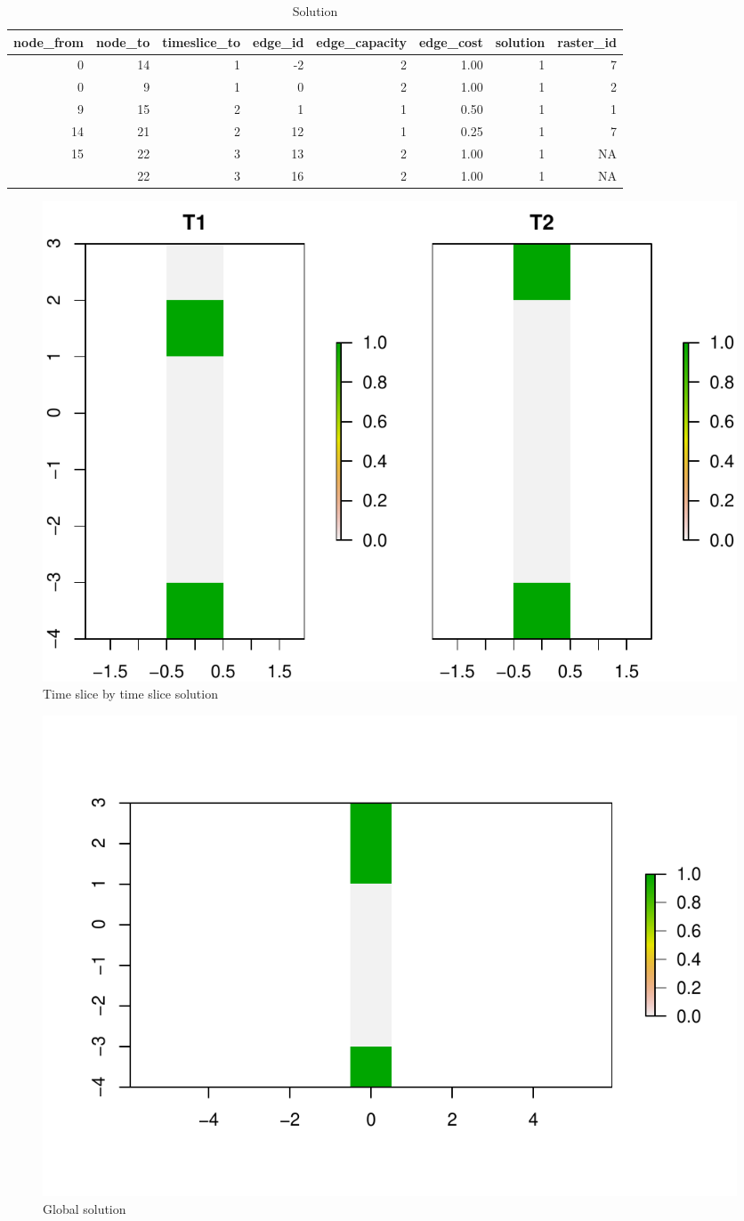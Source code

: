 \documentclass[]{article}
\begin{document}
\begin{table}[!h]

\caption{\label{tab:Solution}Solution}
\centering
\begin{tabular}[t]{rrrrrrrr}
\toprule
node\_from & node\_to & timeslice\_to & edge\_id & edge\_capacity & edge\_cost & solution & raster\_id\\
\midrule
\rowcolor{gray!6}  0 & 14 & 1 & -2 & 2 & 1.00 & 1 & 7\\
0 & 9 & 1 & 0 & 2 & 1.00 & 1 & 2\\
\rowcolor{gray!6}  9 & 15 & 2 & 1 & 1 & 0.50 & 1 & 1\\
14 & 21 & 2 & 12 & 1 & 0.25 & 1 & 7\\
\rowcolor{gray!6}  15 & 22 & 3 & 13 & 2 & 1.00 & 1 & NA\\
\addlinespace
21 & 22 & 3 & 16 & 2 & 1.00 & 1 & NA\\
\bottomrule
\end{tabular}
\end{table}

\begin{figure}
\centering
\includegraphics{Ideas2_files/figure-latex/unnamed-chunk-19-1.pdf}
\caption{\label{fig:unnamed-chunk-19}Time slice by time slice solution}
\end{figure}

\begin{figure}
\centering
\includegraphics{Ideas2_files/figure-latex/unnamed-chunk-20-1.pdf}
\caption{\label{fig:unnamed-chunk-20}Global solution}
\end{figure}
\end{document}
